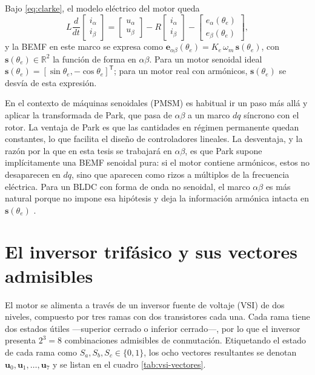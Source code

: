 \documentclass[../../../Tesis_JALS_Maestria.tex]{subfiles}
\begin{document}
Bajo \eqref{eq:clarke}, el modelo eléctrico del motor queda
\begin{equation}
    L \frac{d}{dt}\begin{bmatrix} i_\alpha \\ i_\beta \end{bmatrix}
    = \begin{bmatrix} u_\alpha \\ u_\beta \end{bmatrix}
    - R \begin{bmatrix} i_\alpha \\ i_\beta \end{bmatrix}
    - \begin{bmatrix} e_\alpha(\theta_e) \\ e_\beta(\theta_e) \end{bmatrix},
    \label{eq:modelo-ab}
\end{equation}
y la BEMF en este marco se expresa como $\mathbf{e}_{\alpha\beta}(\theta_e) = K_e\,\omega_m\,\mathbf{s}(\theta_e)$, con $\mathbf{s}(\theta_e) \in \mathbb{R}^2$ la función de forma en $\alpha\beta$. Para un motor senoidal ideal $\mathbf{s}(\theta_e) = [\sin\theta_e, -\cos\theta_e]^{\mathsf T}$; para un motor real con armónicos, $\mathbf{s}(\theta_e)$ se desvía de esta expresión.

En el contexto de máquinas senoidales (PMSM) es habitual ir un paso más allá y aplicar la transformada de Park, que pasa de $\alpha\beta$ a un marco $dq$ síncrono con el rotor. La ventaja de Park es que las cantidades en régimen permanente quedan constantes, lo que facilita el diseño de controladores lineales. La desventaja, y la razón por la que en esta tesis se trabajará en $\alpha\beta$, es que Park supone implícitamente una BEMF senoidal pura: si el motor contiene armónicos, estos no desaparecen en $dq$, sino que aparecen como rizos a múltiplos de la frecuencia eléctrica. Para un BLDC con forma de onda no senoidal, el marco $\alpha\beta$ es más natural porque no impone esa hipótesis y deja la información armónica intacta en $\mathbf{s}(\theta_e)$ \citep{rodriguez2012predictive}.

\section{El inversor trifásico y sus vectores admisibles}
\label{sec:vsi}

El motor se alimenta a través de un inversor fuente de voltaje (VSI) de dos niveles, compuesto por tres ramas con dos transistores cada una. Cada rama tiene dos estados útiles ---superior cerrado o inferior cerrado---, por lo que el inversor presenta $2^3 = 8$ combinaciones admisibles de conmutación. Etiquetando el estado de cada rama como $S_a, S_b, S_c \in \{0,1\}$, los ocho vectores resultantes se denotan $\mathbf{u}_0, \mathbf{u}_1, \dots, \mathbf{u}_7$ y se listan en el cuadro \ref{tab:vsi-vectores}.
\end{document}
